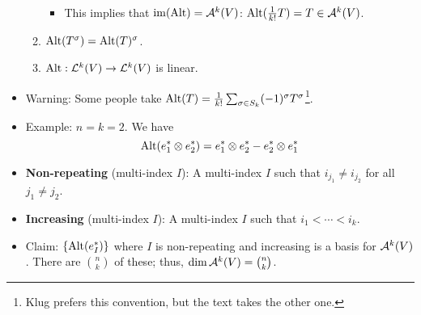 \documentclass[../notes.tex]{subfiles}
\begin{document}
\begin{itemize}
\begin{enumerate}
\begin{itemize}
            \item This implies that $\im(\Alt)=\alt[k]{V}$: $\Alt(\frac{1}{k!}T)=T\in\alt[k]{V}$.
        \end{itemize}
        \item $\Alt(T^\sigma)=\Alt(T)^\sigma$.
        \item $\Alt:\lin[k]{V}\to\lin[k]{V}$ is linear.
    \end{enumerate}
    \item Warning: Some people take $\Alt(T)=\frac{1}{k!}\sum_{\sigma\in S_k}(-1)^\sigma T^\sigma$\footnote{Klug prefers this convention, but the text takes the other one.}.
    \item Example: $n=k=2$. We have
    \begin{equation*}
        \Alt(e_1^*\otimes e_2^*) = e_1^*\otimes e_2^*-e_2^*\otimes e_1^*
    \end{equation*}
    \item \textbf{Non-repeating} (multi-index $I$): A multi-index $I$ such that $i_{j_1}\neq i_{j_2}$ for all $j_1\neq j_2$.
    \item \textbf{Increasing} (multi-index $I$): A multi-index $I$ such that $i_1<\cdots<i_k$.
    \item Claim: $\{\Alt(e_I^*)\}$ where $I$ is non-repeating and increasing is a basis for $\alt[k]{V}$. There are $\binom{n}{k}$ of these; thus, $\dim\alt[k]{V}=\binom{n}{k}$.
\end{itemize}
\end{document}
